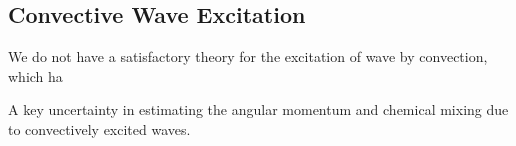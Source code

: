 {\color{purple}
\subsection{Convective Wave Excitation}
}

We do not have a satisfactory theory for the excitation of wave by convection, which ha

A key uncertainty in estimating the angular momentum and chemical mixing due to convectively excited waves.
